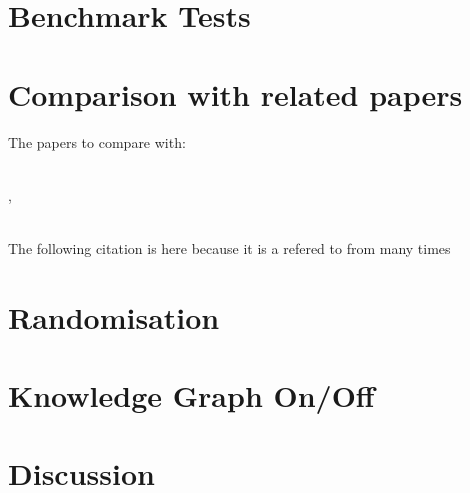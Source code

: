 \newpage
\section{Benchmark Tests}%
\label{sec:benchmark_tests}

\section{Comparison with related papers}%
\label{sec:compare_with_related_papers}

The papers to compare with:\newline

\\

\cite{sabbaghnovin_model_2021}, 


\\
\cite{novin_dynamic_2018}
The following \cite{novin_dynamic_2018} citation is here because it is a refered to from \cite{sabbaghnovin_model_2021} many times


\section{Randomisation}%
\label{sec:randomisation}

\section{Knowledge Graph On/Off}%
\label{sec:kgraph_on_off}

\section{Discussion}%
\label{sec:discussion}
